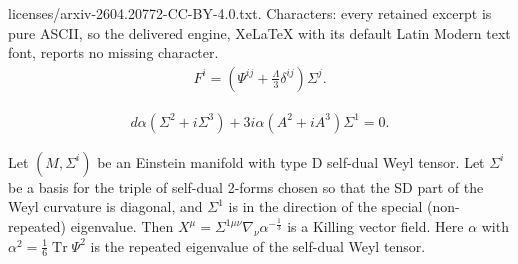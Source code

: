 \documentclass[10pt,a4paper]{amsart}
\DeclareMathOperator{\Tr}{Tr}
\begin{document}
licenses/arxiv-2604.20772-CC-BY-4.0.txt. Characters: every retained excerpt is pure ASCII, so the delivered engine, XeLaTeX with its default Latin Modern text font, reports no missing character.
    \begin{align}\label{Einstein}
        F^i = \left( \Psi^{ij} + \frac{\Lambda}{3} \delta^{ij} \right)\Sigma^j.
    \end{align}

    \begin{align}\label{d-Omega-Sigma-1}
    d\alpha (\Sigma^2+i \Sigma^3) + 3i \alpha (A^2+i A^3) \Sigma^1=0.
    \end{align}

\begin{proposition} \label{prop:ConfKahlerKillingVector}
    Let $(M,\Sigma^i)$ be an Einstein manifold with type D self-dual Weyl tensor. Let $\Sigma^i$ be a basis for the triple of self-dual 2-forms chosen so that the SD part of the Weyl curvature is diagonal, and $\Sigma^1$ is in the direction of the special (non-repeated) eigenvalue. Then $X^\mu = \Sigma^{1\mu \nu} \nabla_\nu \alpha^{-\frac{1}{3}}$ is a Killing vector field. Here $\alpha$ with $\alpha^2 = \frac{1}{6}\Tr{\Psi^2}$ is the repeated eigenvalue of the self-dual Weyl tensor.
\end{proposition}
\end{document}

